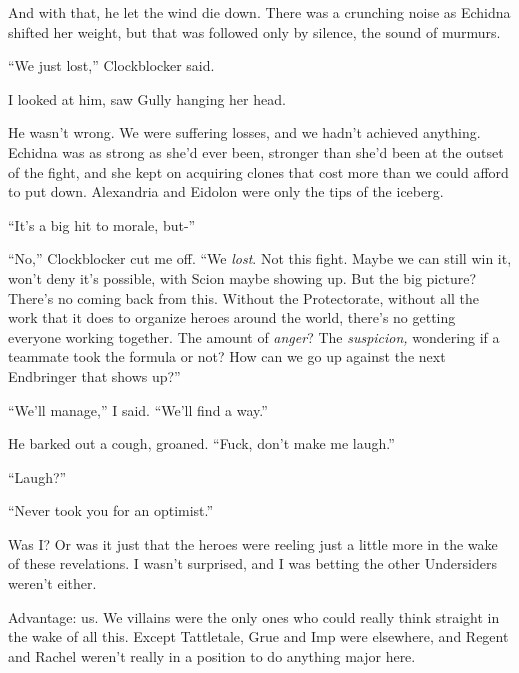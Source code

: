 And with that, he let the wind die down.  There was a crunching noise as Echidna shifted her weight, but that was followed only by silence, the sound of murmurs.



``We just lost,'' Clockblocker said.



I looked at him, saw Gully hanging her head.



He wasn't wrong.  We were suffering losses, and we hadn't achieved anything.  Echidna was as strong as she'd ever been, stronger than she'd been at the outset of the fight, and she kept on acquiring clones that cost more than we could afford to put down.  Alexandria and Eidolon were only the tips of the iceberg.



``It's a big hit to morale, but-''



``No,'' Clockblocker cut me off.  ``We \emph{lost}.  Not this fight.  Maybe we can still win it, won't deny it's possible, with Scion maybe showing up.  But the big picture?  There's no coming back from this.  Without the Protectorate, without all the work that it does to organize heroes around the world, there's no getting everyone working together.  The amount of \emph{anger}?  The \emph{suspicion, }wondering if a teammate took the formula or not?  How can we go up against the next Endbringer that shows up?''



``We'll manage,'' I said.  ``We'll find a way.''



He barked out a cough, groaned.  ``Fuck, don't make me laugh.''



``Laugh?''



``Never took you for an optimist.''



Was I?  Or was it just that the heroes were reeling just a little more in the wake of these revelations.  I wasn't surprised, and I was betting the other Undersiders weren't either.



Advantage: us.  We villains were the only ones who could really think straight in the wake of all this.  Except Tattletale, Grue and Imp were elsewhere, and Regent and Rachel weren't really in a position to do anything major here.



